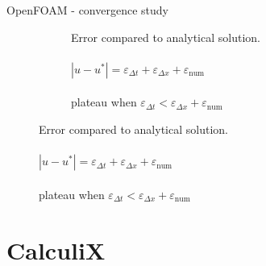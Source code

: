 \documentclass[
  english,            %
  aspectratio=43,    %
]{tumbeamer}
\begin{document}
\begin{frame}{OpenFOAM - convergence study}
\begin{figure}[!htbp]
\begin{subfigure}[b]{0.49\textwidth}
      \caption{Error compared to analytical solution. \\ \\
      $|u - u^*| = \varepsilon_{\Delta t} + \varepsilon_{\Delta x} + \varepsilon_\text{num}$ \\ \\
      plateau when $\varepsilon_{\Delta t} < \varepsilon_{\Delta x} + \varepsilon_\text{num}$
      }
      \label{fig:RMSE_openfoam}
    \end{subfigure}
    \label{fig:figures}
  \end{figure}



\end{frame}

\section{CalculiX}
\end{document}
